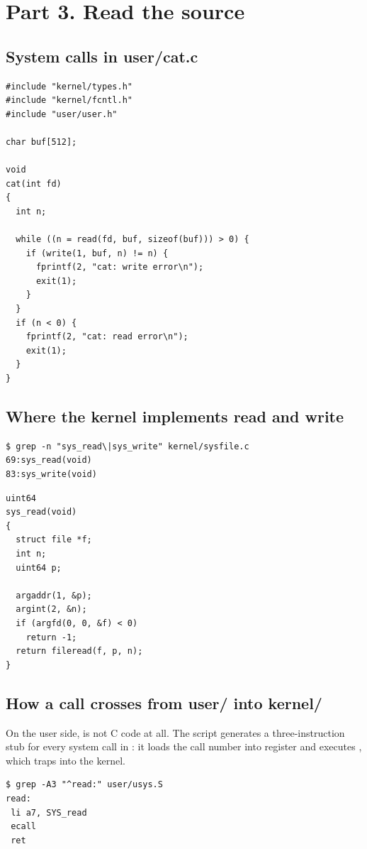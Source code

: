 \documentclass[11pt,a4paper]{article}
\begin{document}
\section{Part 3. Read the source}

\subsection{System calls in user/cat.c}

\begin{lstlisting}[style=ccode]
#include "kernel/types.h"
#include "kernel/fcntl.h"
#include "user/user.h"

char buf[512];

void
cat(int fd)
{
  int n;

  while ((n = read(fd, buf, sizeof(buf))) > 0) {
    if (write(1, buf, n) != n) {
      fprintf(2, "cat: write error\n");
      exit(1);
    }
  }
  if (n < 0) {
    fprintf(2, "cat: read error\n");
    exit(1);
  }
}
\end{lstlisting}

\subsection{Where the kernel implements read and write}

\begin{lstlisting}
$ grep -n "sys_read\|sys_write" kernel/sysfile.c
69:sys_read(void)
83:sys_write(void)
\end{lstlisting}

\begin{lstlisting}[style=ccode,firstnumber=68]
uint64
sys_read(void)
{
  struct file *f;
  int n;
  uint64 p;

  argaddr(1, &p);
  argint(2, &n);
  if (argfd(0, 0, &f) < 0)
    return -1;
  return fileread(f, p, n);
}
\end{lstlisting}

\subsection{How a call crosses from user/ into kernel/}

On the user side,  is not C code at all. The script  generates
a three-instruction stub for every system call in : it loads the call
number into register  and executes , which traps into the kernel.

\begin{lstlisting}
$ grep -A3 "^read:" user/usys.S
read:
 li a7, SYS_read
 ecall
 ret
\end{lstlisting}
\end{document}
